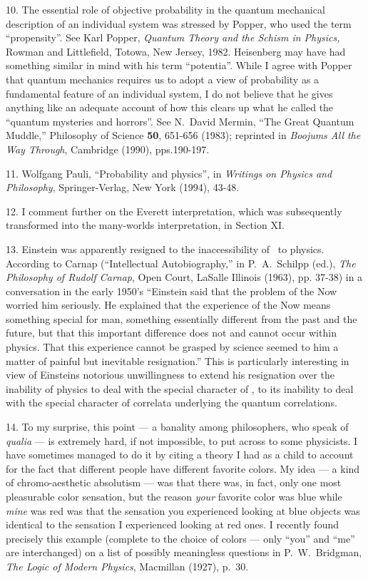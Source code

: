 10. The essential role of objective probability in the quantum
mechanical description of an individual system was stressed by Popper,
who used the term ``propensity''. See Karl Popper, {\it Quantum Theory
and the Schism in Physics,\/} Rowman and Littlefield, Totowa, New
Jersey, 1982.  Heisenberg may have had something similar in mind with
his term ``potentia''.  While I agree with Pop\-per that quantum
mechanics requires us to adopt a view of probability as a fundamental
feature of an individual system, I do not believe that he gives
anything like an adequate account of how this clears up what he called
the ``quantum mysteries and horrors''.  See N.~David Mermin, ``The
Great Quantum Muddle,'' Philosophy of Science {\bf 50}, 651-656
(1983); reprinted in {\it Boojums All the Way Through\/}, Cambridge
(1990), pps.190-197.


11. Wolfgang Pauli,
``Probability and physics'', in {\it Writings on Physics and
Philosophy\/}, Springer-Verlag, New York (1994), 43-48.

12. I comment further on the Everett
interpretation, which was subsequently transformed into the many-worlds
interpretation, in Section XI.

13. Einstein was apparently resigned to the inaccessibility of \now\
to physics.  According to Carnap (``Intellectual
Autobiography,'' in P.~A.~Schilpp (ed.), {\it The Philosophy of Rudolf
Carnap\/}, Open Court, LaSalle Illinois (1963), pp. 37-38) in a
conversation in the early 1950's ``Einstein said that the problem of
the Now worried him seriously.  He explained that the experience of
the Now means something special for man, something essentially
different from the past and the future, but that this important
difference does not and cannot occur within physics.  That this
experience cannot be grasped by science seemed to him a matter of
painful but inevitable resignation.''  This is particularly
interesting in view of Einsteins notorious unwillingness to extend his
resignation over the inability of physics to deal with the special
character of \now, to its inability to deal with the special character
of correlata underlying the quantum correlations.

14.  To my surprise, this point --- a banality among philosophers, who
speak of {\it qualia\/} --- is extremely hard, if not impossible, to
put across to some physicists.  I have sometimes managed to do it by
citing a theory I had as a child to account for the fact that
different people have different favorite colors.  My idea --- a kind
of chromo-aesthetic absolutism --- was that there was, in fact, only
one most pleasurable color sensation, but the reason {\it your\/}
favorite color was blue while {\it mine\/} was red was that the
sensation you experienced looking at blue objects was identical to the
sensation I experienced looking at red ones. I recently found
precisely this example (complete to the choice of colors --- only
``you'' and ``me'' are interchanged) on a list of possibly meaningless
questions in P.~W.~Bridgman, {\it The Logic of Modern Physics\/},
Macmillan (1927), p.~30.

